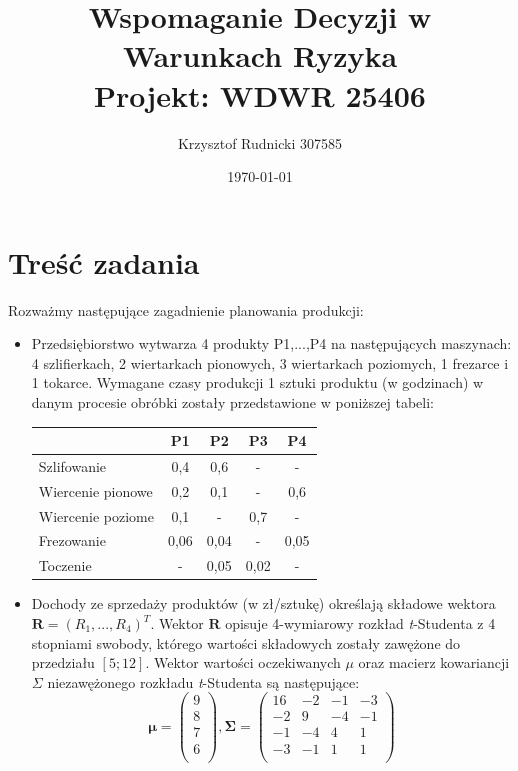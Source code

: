 \documentclass[11pt,a4paper]{article}
\title{Wspomaganie Decyzji w Warunkach Ryzyka\\\large \medskip Projekt: WDWR 25406\\}
\author{Krzysztof Rudnicki 307585}
\date{\today}
\begin{document}
\maketitle

\section*{Treść zadania}
Rozważmy następujące zagadnienie planowania produkcji:

\begin{itemize}
  \item Przedsiębiorstwo wytwarza 4 produkty P1,...,P4 na następujących maszynach: 4 szlifierkach, 
  2 wiertarkach pionowych, 3 wiertarkach poziomych, 1 frezarce i 1 tokarce. Wymagane czasy produkcji 
  1 sztuki produktu (w godzinach) w danym procesie obróbki zostały przedstawione w poniższej tabeli:\\
  \begin{center}
  \begin{tabular}{l*{4}{c}}
  	\hline
              			& P1 & P2 & P3 & P4 \\
	\hline
	Szlifowanie 		& 0,4 & 0,6 & - & - \\
	Wiercenie pionowe   & 0,2 & 0,1 & - & 0,6 \\
	Wiercenie poziome 	& 0,1 & - & 0,7 & -  \\
	Frezowanie  	 	& 0,06 & 0,04 & - & 0,05 \\
	Toczenie	     	& - & 0,05 & 0,02 & - \\
	\hline
	\end{tabular}
	\end{center}

  \item Dochody ze sprzedaży produktów (w zł/sztukę) określają składowe wektora 
  $\mathbf{R} = (R_{1},...,R_{4})^{T}$. Wektor $\mathbf{R}$ opisuje 4-wymiarowy rozkład 
  \textit{t}-Studenta z 4 stopniami swobody, którego wartości składowych zostały zawężone do 
  przedziału $[5;12]$. Wektor wartości oczekiwanych $\mu$ oraz macierz kowariancji 
  $\Sigma$ niezawężonego rozkładu \textit{t}-Studenta są następujące:
  \begin{displaymath}
\mathbf{\mu} = 
 \begin{pmatrix}
  9 \\ 8 \\ 7 \\ 6 \\  
 \end{pmatrix},
 \mathbf{\Sigma} = 
 \begin{pmatrix}
  16 & -2 & -1 & -3 \\
  -2 & 9 & -4 & -1 \\ 
  -1 & -4 & 4 & 1 \\
  -3 & -1 & 1 & 1 \\  
 \end{pmatrix}
  \end{displaymath}
  

\end{itemize}
\end{document}

